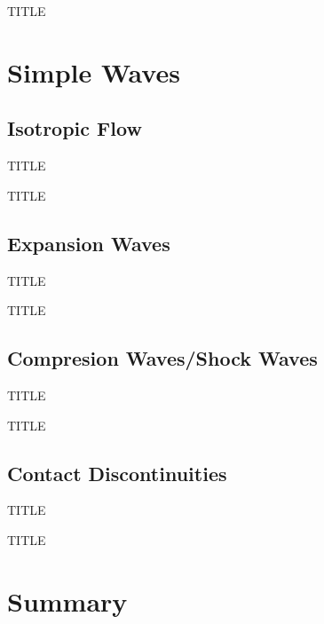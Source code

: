 \documentclass{beamer}
\begin{document}
\begin{frame}{TITLE}
\end{frame}

\section{Simple Waves}

\subsection{Isotropic Flow}

\begin{frame}{TITLE}
\end{frame}

\begin{frame}{TITLE}
\end{frame}

\subsection{Expansion Waves}

\begin{frame}{TITLE}
\end{frame}

\begin{frame}{TITLE}
\end{frame}

\subsection{Compresion Waves/Shock Waves}

\begin{frame}{TITLE}
\end{frame}

\begin{frame}{TITLE}
\end{frame}

\subsection{Contact Discontinuities}

\begin{frame}{TITLE}
\end{frame}

\begin{frame}{TITLE}
\end{frame}

\section*{Summary}
\end{document}
